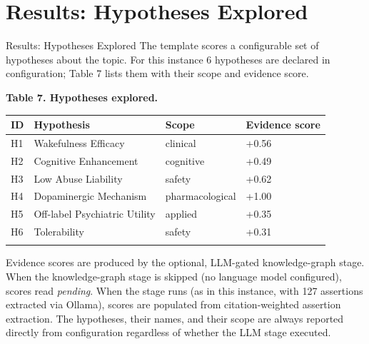 \documentclass[
  ignorenonframetext,
]{beamer}
\author{\texorpdfstring{}{}}
\date{}
\newcounter{none} %
\begin{document}
\section{Results: Hypotheses
Explored}\label{results-hypotheses-explored}

\begin{frame}[allowframebreaks]{Results: Hypotheses Explored}
The template scores a configurable set of hypotheses about the topic.
For this instance 6 hypotheses are declared in configuration; Table 7
lists them with their scope and evidence score.

\textbf{Table 7. Hypotheses explored.}

{\def\LTcaptype{none} %
\begin{longtable}[]{@{}llll@{}}
\toprule\noalign{}
ID & Hypothesis & Scope & Evidence score \\
\midrule\noalign{}
\endhead
H1 & Wakefulness Efficacy & clinical & +0.56 \\
H2 & Cognitive Enhancement & cognitive & +0.49 \\
H3 & Low Abuse Liability & safety & +0.62 \\
H4 & Dopaminergic Mechanism & pharmacological & +1.00 \\
H5 & Off-label Psychiatric Utility & applied & +0.35 \\
H6 & Tolerability & safety & +0.31 \\
\bottomrule\noalign{}
\end{longtable}
}

Evidence scores are produced by the optional, LLM-gated knowledge-graph
stage. When the knowledge-graph stage is skipped (no language model
configured), scores read \emph{pending}. When the stage runs (as in this
instance, with 127 assertions extracted via Ollama), scores are
populated from citation-weighted assertion extraction. The hypotheses,
their names, and their scope are always reported directly from
configuration regardless of whether the LLM stage executed.
\end{frame}
\end{document}
